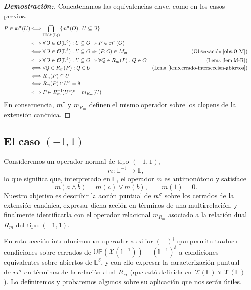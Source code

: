 \documentclass[12pt]{book}
\newcommand{\Up}{\mathbb{UP}}
\begin{document}
\begin{proof}[\textbf{Demostración:}]
Concatenamos las equivalencias clave, como en los casos previos.
\begin{align*}
P \in m^\pi(U)&\Longleftrightarrow \bigcap_{\Up(\mathcal{X}(\mathbb L))}\{m^\pi (O):U\subseteq O\}\\
&\Longleftrightarrow 
\forall\,O \in\mathcal O(\mathbb L^\delta) :U\subseteq O\Rightarrow P\in m^\pi(O)\\
&\Longleftrightarrow 
\forall\,O\in\mathcal O(\mathbb L^\delta) :U\subseteq O\Rightarrow (P,O)\in M_m & \text{(Observación \ref{obs:O-M}})\\
&\Longleftrightarrow 
\forall\,O\in\mathcal O(\mathbb L^\delta) :U\subseteq O\Rightarrow\forall Q\in R_m(P): Q\in O & \text{(Lema \ref{lem:M-R}})\\
&\Longleftrightarrow 
\forall Q\in R_m(P): Q\in U  & \text{(Lema \ref{lem:cerrado-interseccion-abiertos}})\\
&\Longleftrightarrow 
R_m(P)\subseteq U\\
&\Longleftrightarrow 
R_m(P)\cap U^c=\emptyset\\
&\Longleftrightarrow 
P\in R_m^{-1}(U^c)^c=m_{R_m}(U)
\end{align*}
En consecuencia, $m^\pi$ y $m_{R_m}$ definen el mismo operador sobre los clopens de la extensión canónica.
\end{proof}





\subsection*{El caso $(-1,1)$}

Consideremos un operador normal de tipo $(-1,1)$,
\[
m:\mathbb L^{-1} \longrightarrow \mathbb L,
\]
lo que significa que, interpretado en $\mathbb L$, el operador $m$ es
antimonótono y satisface
\[
m(a\wedge b)=m(a)\vee m(b), \qquad m(1)=0.
\]
Nuestro objetivo es describir la acción puntual de $m^\sigma$ sobre los cerrados de la extensión canónica, expresar dicha
acción en términos de una multirrelación, y finalmente identificarla con el operador relacional
$m_{R_m}$ asociado a la relación dual $R_m$ del tipo $(-1,1)$.

\medskip

En esta sección introducimos un operador auxiliar 
\((-)^{\dagger}\) que permite traducir condiciones sobre 
cerrados de $\Up(\mathcal X(\mathbb L^{-1}))=(\mathbb{L}^{-1})^\delta$ 
a condiciones equivalentes sobre abiertos de 
$\mathbb{L}^\delta$, y con ello expresar 
la caracterización puntual de $m^\sigma$ en términos 
de la relación dual $R_m$ (que está definida en $\mathcal X(\mathbb L)\times \mathcal X(\mathbb L)$). Lo definiremos y probaremos algunos sobre su aplicación que nos serán útiles.
\end{document}
